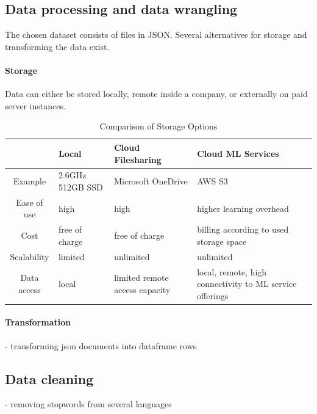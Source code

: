 	\subsection{Data processing and data wrangling}
	The chosen dataset consists of files in \ac{JSON}. Several alternatives for storage and transforming the data exist. 
	
	\paragraph{Storage}
	Data can either be stored locally, remote inside a company, or externally on paid server instances.
	
	\begin{table}[ht]
		\centering
		\caption{Comparison of Storage Options}
		\begin{tabular}{c|lll}
			\toprule
			&\textbf{Local} & \textbf{Cloud Filesharing} & \textbf{Cloud ML Services} \\
			\midrule
			Example     & 2.6GHz 512GB SSD & Microsoft OneDrive             & AWS S3                                                   \\
			Ease of use & high             & high                           & higher learning overhead                                 \\
			Cost        & free of charge   & free of charge                 & billing according to used storage space                  \\
			Scalability & limited          & unlimited                      & unlimited                                                \\
			Data access & local            & limited remote access capacity & local, remote, high connectivity to ML service offerings

		\end{tabular}
		\label{tabelle:storage}
	\end{table}
	
	
	
	\paragraph{Transformation}
	- transforming json documents into dataframe rows
	
	
	\subsection{Data cleaning}
	- removing stopwords from several languages
	
